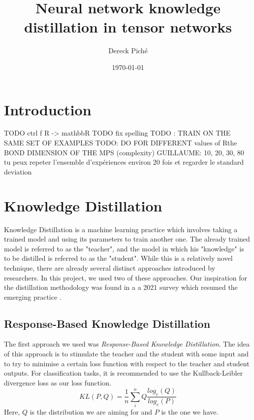 \documentclass{article}
\title{Neural network knowledge distillation in tensor networks}
\author{Dereck Piché}
\date{\today}
\theoremstyle{definition}
\theoremstyle{definition}
\begin{document}
\maketitle

\begin{abstract}
\end{abstract}

\section{Introduction}
TODO ctrl f R -> mathbb{R}
TODO fix spelling
TODO : TRAIN ON THE SAME SET OF EXAMPLES
TODO: DO FOR DIFFERENT values of Rthe BOND DIMENSION OF THE MPS (complexity)
GUILLAUME: 10, 20, 30, 80
tu peux repeter l'ensemble d'expériences environ 20 fois et regarder le standard deviation



\section{Knowledge Distillation}
Knowledge Distillation is a machine learning practice which involves
taking a trained model and using its parameters to train another one.
The already trained model is referred to as the "teacher", and 
the model in which his "knowledge" is to be distilled is referred to as
the "student". While this is a relatively novel technique, there are 
already several distinct approaches introduced by researchers.
In this project, we used two of these approaches. Our inspiration for the distillation 
methodology was found in a a 2021 survey which resumed the emerging 
practice \cite{Gou_2021}.

\subsection{Response-Based Knowledge Distillation}
The first approach we used was \emph{Response-Based Knowledge Distillation}. The idea of this approach is to stimulate the teacher and the student with some input and to try to minimise a certain loss function with respect to the teacher and student outputs. For classification tasks, it is recommended to use the Kullback-Leibler divergence loss as our loss function. 
\begin{equation}
    KL(P, Q) = \frac{1}{n} \sum_i^n Q \frac{log_e(Q)}{log_e(P)}
\end{equation}
Here, $Q$ is the distribution we are aiming for and $P$ is the one we have.
\end{document}
